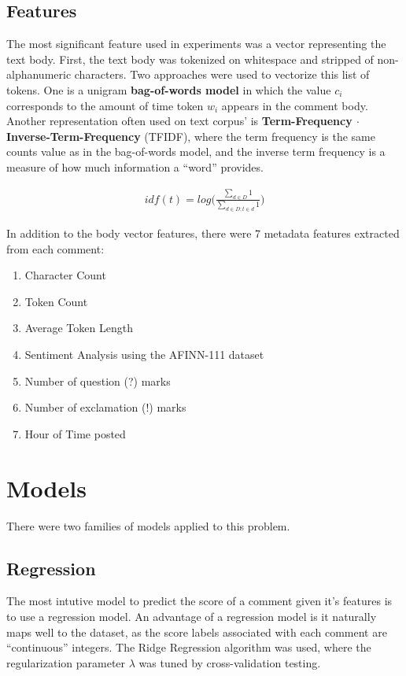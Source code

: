 \documentclass[11pt, twocolumn]{article}
\begin{document}
	\subsection{Features}
	The most significant feature used in experiments was a vector representing the text body. First, the text body was tokenized on whitespace and stripped of non-alphanumeric characters. Two approaches were used to vectorize this list of tokens. One is a unigram \textbf{bag-of-words model} in which the value $c_i$ corresponds to the amount of time token $w_i$ appears in the comment body. Another representation often used on text corpus' is \textbf{Term-Frequency $\cdot$Inverse-Term-Frequency} (TFIDF), where the term frequency is the same counts value as in the bag-of-words model, and the inverse term frequency is a measure of how much information a ``word'' provides.
	
	\begin{gather*}
		idf(t) = log \bigg( \frac{\sum_{d \in D}{1}}{\sum_{d \in D; t \in d}{1}} \bigg)
	\end{gather*}
		
	In addition to the body vector features, there were 7 metadata features extracted from each comment:
	\begin{enumerate}
		\setlength\itemsep{-0.3em}
		\item Character Count
		\item Token Count
		\item Average Token Length
		\item Sentiment Analysis using the AFINN-111 dataset \cite{sentiment} 
		\item Number of question (?) marks
		\item Number of exclamation (!) marks
		\item Hour of Time posted
	\end{enumerate}

\section{Models}
	There were two families of models  applied to this problem.
	
	\subsection{Regression}
	The most intutive model to predict the score of a comment given it's features is to use a regression model. An advantage of a regression model is it naturally maps well to the dataset, as the score labels associated with each comment are ``continuous'' integers. The Ridge Regression algorithm was used, where the regularization parameter $\lambda$ was tuned by cross-validation testing.
	
\end{document}
